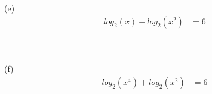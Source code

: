 \begin{exercise}
	(e)
	\begin{align}
		log_2(x) + log_2(x^2) & = 6 \\
		\\
		\\
		\\
		\\
		\\
	\end{align}
	\\

	(f)
	\begin{align}
		log_2(x^4) + log_2(x^2) & = 6     \\
		\\
		\\
		\\
		\\
		\\
	\end{align}
\end{exercise}